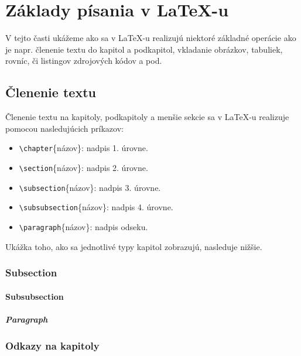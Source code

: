 \chapter{Základy písania v LaTeX-u}

V tejto časti ukážeme ako sa v LaTeX-u realizujú niektoré základné operácie ako je napr. členenie textu do kapitol a podkapitol, vkladanie obrázkov, tabuliek, rovníc, či listingov zdrojových kódov a pod.

\section{Členenie textu}
\label{sec:clenenie_textu}

Členenie textu na kapitoly, podkapitoly a menšie sekcie sa v LaTeX-u realizuje pomocou nasledujúcich príkazov:
\begin{itemize}
\item \texttt{{\textbackslash}chapter}\{názov\}: nadpis 1. úrovne.
\item \texttt{{\textbackslash}section}\{názov\}: nadpis 2. úrovne.
\item \texttt{{\textbackslash}subsection}\{názov\}: nadpis 3. úrovne.
\item \texttt{{\textbackslash}subsubsection}\{názov\}: nadpis 4. úrovne.
\item \texttt{{\textbackslash}paragraph}\{názov\}: nadpis odseku.
\end{itemize}
Ukážka toho, ako sa jednotlivé typy kapitol zobrazujú, nasleduje nižšie.

\subsection{Subsection}

\blindtext

\subsubsection{Subsubsection}

\blindtext

\paragraph{Paragraph}

\blindtext

\subsection{Odkazy na kapitoly}

